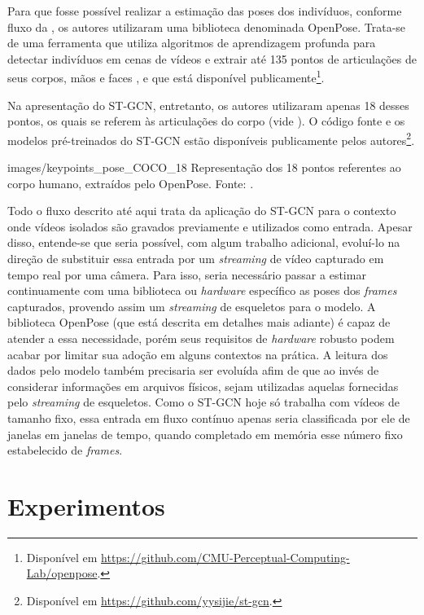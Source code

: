 Para que fosse possível realizar a estimação das poses dos indivíduos, conforme fluxo da , os autores utilizaram uma biblioteca denominada OpenPose. Trata-se de uma ferramenta que utiliza algoritmos de aprendizagem profunda para detectar indivíduos em cenas de vídeos e extrair até 135 pontos de articulações de seus corpos, mãos e faces \cite{cao-realtime-2017, simon-hand-2017, wei-cpm-2016}, e que está disponível publicamente\footnote{
    Disponível em \url{https://github.com/CMU-Perceptual-Computing-Lab/openpose}.
}.

Na apresentação do ST-GCN, entretanto, os autores utilizaram apenas 18 desses pontos, os quais se referem às articulações do corpo (vide ). O código fonte e os modelos pré-treinados do ST-GCN estão disponíveis publicamente pelos autores\footnote{
    Disponível em \url{https://github.com/yysijie/st-gcn}.
}.

    {images/keypoints_pose_COCO_18}
    {Representação dos 18 pontos referentes ao corpo humano, extraídos pelo OpenPose. Fonte: \cite{openpose-output-2018}.}

Todo o fluxo descrito até aqui trata da aplicação do ST-GCN para o contexto onde vídeos isolados são gravados previamente e utilizados como entrada. Apesar disso, entende-se que seria possível, com algum trabalho adicional, evoluí-lo na direção de substituir essa entrada por um \textit{streaming} de vídeo capturado em tempo real por uma câmera. Para isso, seria necessário passar a estimar continuamente com uma biblioteca ou \textit{hardware} específico as poses dos \textit{frames} capturados, provendo assim um \textit{streaming} de esqueletos para o modelo. A biblioteca OpenPose (que está descrita em detalhes mais adiante) é capaz de atender a essa necessidade, porém seus requisitos de \textit{hardware} robusto podem acabar por limitar sua adoção em alguns contextos na prática. A leitura dos dados pelo modelo também precisaria ser evoluída afim de que ao invés de considerar informações em arquivos físicos, sejam utilizadas aquelas fornecidas pelo \textit{streaming} de esqueletos. Como o ST-GCN hoje só trabalha com vídeos de tamanho fixo, essa entrada em fluxo contínuo apenas seria classificada por ele de janelas em janelas de tempo, quando completado em memória esse número fixo estabelecido de \textit{frames}.


\section{Experimentos} %
\label{sec:experimentos}

